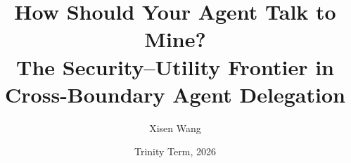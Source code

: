 \documentclass[report,11pt,review,oneside,leftmargin=20mm,bottommargin=20mm,font={Times New Roman},mathfont={STIX Two Math}]{oxengthesis}
\title       {How Should Your Agent Talk to Mine? \\ The Security--Utility Frontier in Cross-Boundary Agent Delegation}
\author      {Xisen Wang}
\date        {Trinity Term, 2026}
\begin{document}
\frontmatter
\makefrontmatterpages

\mainmatter















\appendix

\backmatter
\listofreferences
\end{document}
